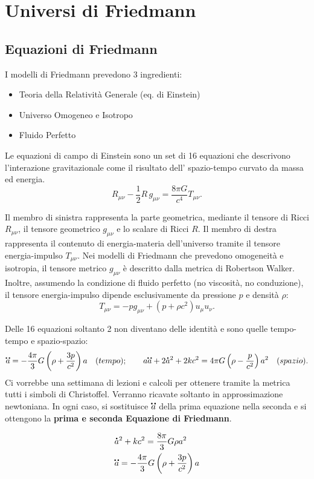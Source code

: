 \chapter{Universi di Friedmann}\label{2:chuniinfuga}

\section{Equazioni di Friedmann}
I modelli di Friedmann prevedono 3 ingredienti:
\begin{itemize}
    \item Teoria della Relatività Generale (eq. di Einstein)
    \item Universo Omogeneo e Isotropo
    \item Fluido Perfetto
\end{itemize}


Le equazioni di campo di Einstein sono un set di 16 equazioni che descrivono l'interazione gravitazionale come il risultato dell' spazio-tempo curvato da massa ed energia. 
$$R_{\mu \nu} - \frac{1}{2} R \, g_{\mu \nu} = \frac{8 \pi G}{c^4} T_{\mu \nu}.$$

Il membro di sinistra rappresenta la parte geometrica, mediante il tensore di Ricci $R_{\mu \nu}$, il tensore geometrico $g_{\mu \nu}$ e lo scalare di Ricci $R$. Il membro di destra rappresenta il contenuto di energia-materia dell'universo tramite il tensore energia-impulso $T_{\mu \nu}$. 
Nei modelli di Friedmann che prevedono omogeneità e isotropia, il tensore metrico $g_{\mu \nu}$ è descritto dalla metrica di Robertson Walker. Inoltre, assumendo la condizione di fluido perfetto (no viscosità, no conduzione), il tensore energia-impulso dipende esclusivamente da pressione $p$ e densità $\rho$:
$$T_{\mu \nu}=-pg_{\mu \nu}+(p+\rho c^2)u_\mu u_\nu .$$

Delle 16 equazioni soltanto 2 non diventano delle identità e sono quelle tempo-tempo e spazio-spazio:
$$
\accentset{\mbox{\large\bfseries ..}}{a}=-\frac{4\pi}{3}G\left ( \rho+\frac{3p}{c^2} \right )a\quad (tempo); \qquad
a\accentset{\mbox{\large\bfseries ..}}{a}+2\accentset{\mbox{\large\bfseries .}}{a}^2+2kc^2=4\pi G \left ( \rho - \frac{p}{c^2} \right )a^2\quad (spazio).
$$
Ci vorrebbe una settimana di lezioni e calcoli per ottenere tramite la metrica tutti i simboli di Christoffel. Verranno ricavate soltanto in approssimazione newtoniana. In ogni caso, si sostituisce $\accentset{\mbox{\large\bfseries ..}}{a}$ della prima equazione nella seconda e si ottengono la \textbf{prima e seconda Equazione di Friedmann}.

\begin{align}
   & \accentset{\mbox{\large\bfseries .}}{a}^2+kc^2  =\frac{8\pi}{3}G\rho a^2 \label{eq:friedmann2}\\
   & \accentset{\mbox{\large\bfseries ..}}{a}  =-\frac{4\pi}{3}G\left ( \rho+\frac{3p}{c^2} \right )a \label{eq:friedmann1}
\end{align}

